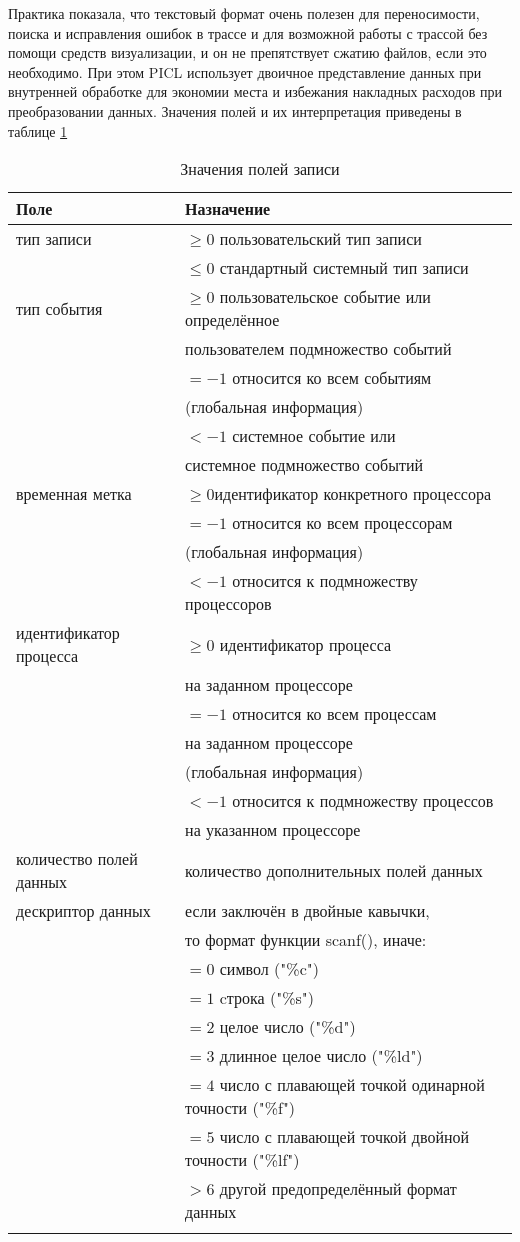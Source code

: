     Практика показала, что текстовый формат очень полезен для переносимости, поиска и исправления ошибок в трассе и для возможной работы с трассой без помощи средств визуализации, и он не препятствует сжатию файлов, если это необходимо. При этом PICL использует двоичное представление данных при внутренней обработке для экономии места и избежания накладных расходов при преобразовании данных.
Значения полей и их интерпретация приведены в таблице \ref{tab:tbl2}
\begin{table}[h!]
	\caption{\label{tab:tbl2} Значения полей записи}
	\begin{tabular}{|l|l|}
		\hline
		Поле & Назначение \\
		\hline\hline
		тип записи& $\geq0$ пользовательский тип записи\tabularnewline & $\le0$ стандартный системный тип записи
		\\\hline
		тип события & $\geq0$ пользовательское событие или определённое \tabularnewline & пользователем подмножество событий\tabularnewline & $=-1$ относится ко всем событиям \tabularnewline &(глобальная информация)
		\tabularnewline & $<-1$ системное событие или \tabularnewline &системное подмножество событий
		\\\hline
		временная метка& $\geq0$идентификатор конкретного процессора\tabularnewline & $=-1$ относится ко всем процессорам \tabularnewline &(глобальная информация)
		\tabularnewline & $<-1$ относится к подмножеству процессоров
		\\\hline
		идентификатор процесса
		&$\geq0$ идентификатор процесса\tabularnewline & на заданном процессоре\tabularnewline & $=-1$ относится ко всем процессам\tabularnewline & на заданном процессоре \tabularnewline &(глобальная информация)
		\tabularnewline & $<-1$ относится к подмножеству процессов\tabularnewline & на указанном процессоре
		\\\hline
		количество полей данных	
		&количество дополнительных полей данных	
		\\\hline
          дескриптор данных
		& если заключён в двойные кавычки,\tabularnewline & то формат функции scanf(),
		иначе:\tabularnewline &
		$=0$  символ ("\%c") \tabularnewline & $=1$ cтрока ("\%s") \tabularnewline &
		$=2$ целое число ("\%d") \tabularnewline &
		$=3$ длинное целое число  ("\%ld") \tabularnewline &
	    $=4$ число с плавающей точкой одинарной точности  ("\%f") \tabularnewline &
	    $=5$ число с плавающей точкой двойной точности   ("\%lf") \tabularnewline &
	    $>6$ другой предопределённый формат данных \tabularnewline &
	    
		
		\\\hline
	
	\end{tabular}
\end{table}
